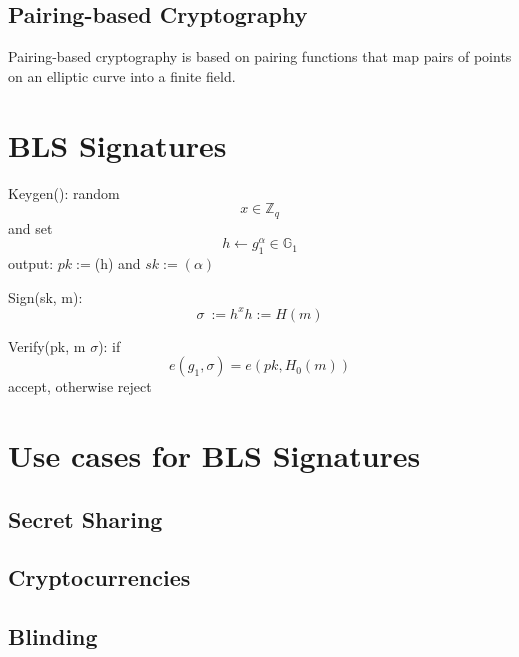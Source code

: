 \documentclass[a4paper,12pt]{scrartcl}
\begin{document}
\subsection{Pairing-based Cryptography}
Pairing-based cryptography is based on pairing functions that map pairs of points on an elliptic curve into a finite field.

\pagebreak

\section{BLS Signatures}
Keygen(): random \[ x\in \mathbb{Z}_{q} \] and set \[ h \leftarrow g_{1}^\alpha\in \mathbb{G}_{1} \] output: \( pk := \)(h) and \( sk := (\alpha) \)


Sign(sk, m): \[ \sigma\ := h^x  h := H(m) \]


Verify(pk, m \(\sigma\)): if \[ e(g_{1},\sigma) = e(pk, H_{0}(m)) \] accept, otherwise reject
\pagebreak

\section{Use cases for BLS Signatures}
\subsection{Secret Sharing}
\subsection{Cryptocurrencies}
\subsection{Blinding}
\pagebreak

\printbibliography
\end{document}
